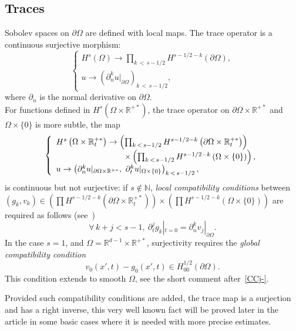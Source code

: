 \documentclass[10pt]{amsart}
\theoremstyle{definition}\newtheorem{defi}[theo]{Definition}\newtheorem{rema}[theo]{Remark}\newtheorem{exam}[theo]{Example}\newtheorem{exem}[theo]{Example}\newtheorem{nota}[theo]{Notation}
\newcommand{\R}{\mathbb{R}}
\newcommand{\N}{\mathbb{N}}
\let\oldforall\forall
\renewcommand*{\forall}{\mathrel{\oldforall}}
\begin{document}
\subsection{Traces}
Sobolev spaces on $\partial\Omega$ are defined with local maps. The trace operator is a continuous surjective morphism:
\[
\left\{
\begin{array}{ll}
H^s(\Omega)\to \prod_{k\,<\,s-1/2} H^{s-1/2-k}(\partial\Omega),\\
u\to \left(\partial_n^ku|_{\partial\Omega}\right)_{k\,<\,s-1/2},
\end{array}\right.
\]
where $\partial_n$ is the normal derivative on $\partial\Omega$.\\
For functions defined in $H^s(\Omega\times
\R^{+*})$, the trace operator on $\partial\Omega\times \R^{+*}$ and $\Omega\times \{0\}$ is more subtle, the map
\begin{equation}\label{trace2}
\left\{
\begin{array}{ll}
H^s\left(\Omega\times \R_t^{+*}\right)\to \left(\prod_{k\,<\,s-1/2} H^{s-1/2-k}\left(\partial\Omega\times \R_t^{+*}\right)\right)
\\
\mkern150mu\times \left(\prod_{k\,<\,s-1/2}H^{s-1/2-k}\left(\Omega \times \{0\}\right)\right),
\\
u\to \left(\partial_n^ku|_{\partial\Omega
\times \R^{+*}},\ \partial_t^ku|_{\Omega\times \{0\}}\right)_{k\,<\,s-1/2},
\end{array}\right.
\end{equation}
is continuous but not surjective: if $s\notin \N$,
\emph{local compatibility conditions} between $(g_k,v_k)\in (\prod H^{s-1/2-k}(\partial\Omega\times \R_t^{+*}))\times (\prod H^{s-1/2-k}(\Omega\times \{0\}))$ are required as follows (see~\cite{lionsmagenes2})
\begin{equation}\label{compaclassique1}
\forall\,k+j<s-1,\
\partial_t^jg_k|_{t=0}=\partial_n^kv_j|_{\partial\Omega}.
\end{equation}
In the case $s=1$, and $\Omega=\R^{d-1}
\times \R^{+*}$, surjectivity requires the \emph{global compatibility condition}
\begin{equation}\label{compaclassique2}
v_0(x',t)-g_0(x',t)\in H^{1/2}_{00}(\partial\Omega).
\end{equation}
This condition extends to smooth $\Omega$, see the short comment after~\eqref{CCj-}.


Provided such compatibility conditions are added, the trace map is a surjection and has a right inverse, this very well known fact will be proved later in the article in some basic cases where it is needed with more precise estimates.
\end{document}
